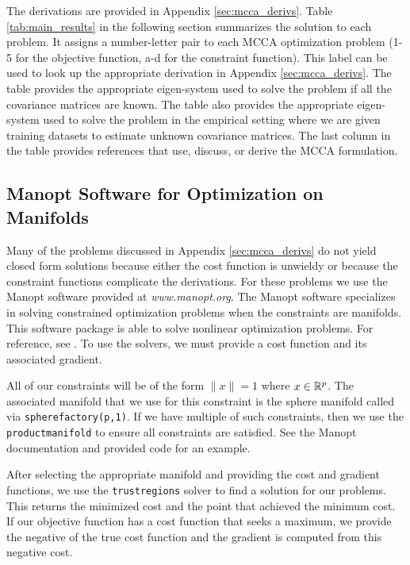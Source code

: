 The derivations are provided in Appendix \ref{sec:mcca_derivs}. Table
\ref{tab:main_results} in the following section summarizes the solution to each
problem. It assigns a number-letter pair to each MCCA optimization problem (1-5 for the
objective function, a-d for the constraint function). This label can be used to look up
the appropriate derivation in Appendix \ref{sec:mcca_derivs}. The table provides the
appropriate eigen-system used to solve the problem if all the covariance matrices are
known. The table also provides the appropriate eigen-system used to solve the problem in
the empirical setting where we are given training datasets to estimate unknown covariance
matrices. The last column in the table provides references that use, discuss, or derive
the MCCA formulation.

\subsection{Manopt Software for Optimization on Manifolds}

Many of the problems discussed in Appendix \ref{sec:mcca_derivs} do not yield closed form
solutions because either the cost function is unwieldy or because the constraint functions
complicate the derivations. For these problems we use the Manopt software provided at
\textit{www.manopt.org}. The Manopt software specializes in solving constrained optimization
problems when the constraints are manifolds. This software package is able to solve
nonlinear optimization problems. For reference, see \cite{boumal2013manopt}. To use the
solvers, we must provide a cost function and its associated gradient.

All of our constraints will be of the form $\|x\|=1$ where $x\in\mathbb{R}^{p}$. The
associated manifold that we use for this constraint is the sphere manifold called via
\texttt{spherefactory(p,1)}. If we have multiple of such constraints, then we use the
\texttt{productmanifold} to ensure all constraints are satisfied. See the Manopt
documentation and provided code for an example. 

After selecting the appropriate manifold and providing the cost and gradient functions, we
use the \texttt{trustregions} solver to find a solution for our problems. This returns the
minimized cost and the point that achieved the minimum cost. If our objective
function has a cost function that seeks a maximum, we provide the negative of the
true cost function and the gradient is computed from this negative cost. 

